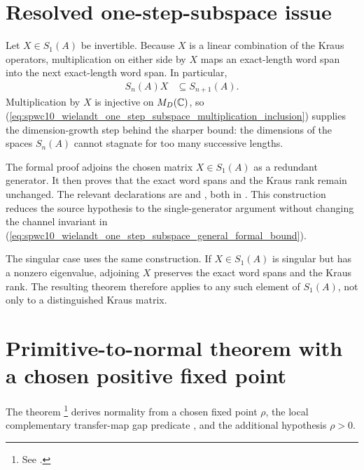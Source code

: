 \documentclass{article}
\begin{document}
\section{Resolved one-step-subspace issue}

Let $X\in S_1(A)$ be invertible. Because $X$ is a linear combination of the
Kraus operators, multiplication on either side by $X$ maps an exact-length word
span into the next exact-length word span. In particular,
\begin{align}
    S_n(A)X
        &\subseteq
        S_{n+1}(A).
    \label{eq:spwc10_wielandt_one_step_subspace_multiplication_inclusion}
\end{align}
Multiplication by $X$ is injective on $M_D(\mathbb{C})$, so
(\ref{eq:spwc10_wielandt_one_step_subspace_multiplication_inclusion}) supplies
the dimension-growth step behind the sharper bound: the dimensions of the
spaces $S_n(A)$ cannot stagnate for too many successive lengths.

The formal proof adjoins the chosen matrix $X\in S_1(A)$ as a redundant
generator. It then proves that the exact word spans and the Kraus rank remain
unchanged. The relevant declarations are
 and
, both in
. This construction
reduces the source hypothesis to the single-generator argument without
changing the channel invariant in
(\ref{eq:spwc10_wielandt_one_step_subspace_general_formal_bound}).

The singular case uses the same construction. If $X\in S_1(A)$ is singular
but has a nonzero eigenvalue, adjoining $X$ preserves the exact word spans and
the Kraus rank. The resulting theorem therefore applies to any such element of
$S_1(A)$, not only to a distinguished Kraus matrix.

\section{Primitive-to-normal theorem with a chosen positive fixed point}

The theorem
\footnote{See
    .}
derives normality from a chosen fixed point $\rho$, the local complementary
transfer-map gap predicate , and the additional
hypothesis $\rho>0$.
\end{document}
